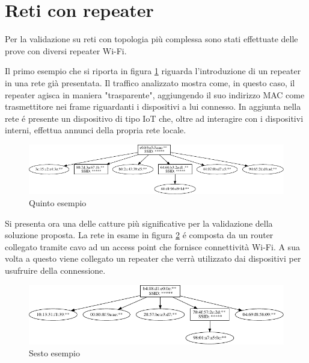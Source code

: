 
\newpage

\section{Reti con repeater}

Per la validazione su reti con topologia pi\`u complessa sono stati effettuate delle prove con diversi repeater Wi-Fi.

Il primo esempio che si riporta in figura \ref{fig:es5} riguarda l'introduzione di un repeater in una rete gi\`a presentata.
Il traffico analizzato mostra come, in questo caso, il repeater agisca in maniera "trasparente", aggiungendo il suo indirizzo MAC come trasmettitore nei frame riguardanti i dispositivi a lui connesso.
In aggiunta nella rete \'e presente un dispositivo di tipo IoT che, oltre ad interagire con i dispositivi interni, effettua annunci della propria rete locale.

\begin{figure}[!h]
	\centering
	\includegraphics{images/img12censored.pdf}
	\caption{Quinto esempio}
	\label{fig:es5}
\end{figure}


Si presenta ora una delle catture pi\`u significative per la validazione della soluzione proposta.
La rete in esame in figura \ref{fig:es6} \'e composta da un router collegato tramite cavo ad un access point che fornisce connettivit\`a Wi-Fi.
A sua volta a questo viene collegato un repeater che verr\`a utilizzato dai dispositivi per usufruire della connessione.

\begin{figure}[!h]
	\centering
	\includegraphics{images/img13censored.pdf}
	\caption{Sesto esempio}
	\label{fig:es6}
\end{figure}


